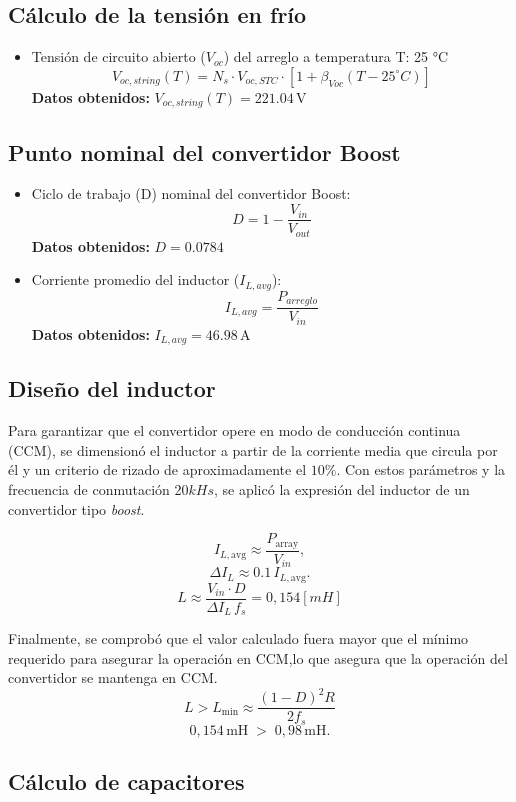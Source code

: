 \subsection{Cálculo de la tensión en frío}
\begin{itemize}
    \item Tensión de circuito abierto ($V_{oc}$) del arreglo a temperatura T: 25 °C
    $$V_{oc,string}(T) = N_{s} \cdot V_{oc,STC} \cdot [1 + \beta_{Voc}(T-25^\circ C)]$$
    \textbf{Datos obtenidos:} $V_{oc,string}(T) = 221.04 \, \text{V}$
\end{itemize}

\subsection{Punto nominal del convertidor Boost}
\begin{itemize}
    \item Ciclo de trabajo (D) nominal del convertidor Boost:
    $$D = 1 - \frac{V_{in}}{V_{out}}$$
    \textbf{Datos obtenidos:} $D = 0.0784$
    
    \item Corriente promedio del inductor ($I_{L,avg}$):
    $$I_{L,avg} = \frac{P_{arreglo}}{V_{in}}$$
    \textbf{Datos obtenidos:} $I_{L,avg} = 46.98 \, \text{A}$
\end{itemize}


\subsection{Diseño del inductor}
Para garantizar que el convertidor opere en modo de conducción continua (CCM), se dimensionó el inductor a partir de la corriente media que circula por él y un criterio de rizado de aproximadamente el $10\%$. Con estos parámetros y la frecuencia de conmutación 20$kHs$, se aplicó la expresión del inductor de un convertidor tipo \textit{boost}.

\[
I_{L,\text{avg}} \approx \frac{P_{\text{array}}}{V_{in}},
\]
\[
\Delta I_L \approx 0.1\, I_{L,\text{avg}}.
\]
\[
L \approx \frac{V_{in} \cdot D}{\Delta I_L \, f_s}=0,154[mH]
\]

Finalmente, se comprobó que el valor calculado fuera mayor que el mínimo requerido para asegurar la operación en CCM,lo que asegura que la operación del convertidor se mantenga en CCM.
\[
L > L_{\min} \approx \frac{(1-D)^2 R}{2 f_s}
\]
\[
0,154 \,\text{mH} \; > \; 0,98 \,\text{mH}.
\]

\subsection{Cálculo de capacitores}

